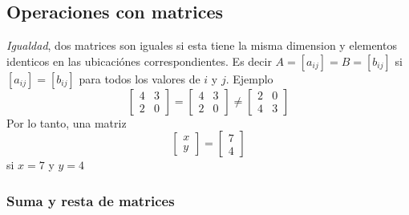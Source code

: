 \subsection{Operaciones con matrices}

\textit{Igualdad}, dos matrices son iguales si esta tiene la misma dimension y elementos identicos en las ubicaciónes correspondientes. Es decir  \(A = [a_{ij}] = B = [b_{ij}]\) si \([a_{ij}] = [b_{ij}]\) para todos los valores de \(i\) y \(j\). Ejemplo 
\[
\begin{bmatrix}
    4 & 3 \\
    2 & 0
\end{bmatrix}
= 
\begin{bmatrix}
    4 & 3 \\
    2 & 0
\end{bmatrix}
\neq
\begin{bmatrix}
    2 & 0 \\
    4 & 3 
\end{bmatrix}
\]
Por lo tanto, una matriz 
\[
\begin{bmatrix}
    x \\
    y
\end{bmatrix}
= \begin{bmatrix}
    7 \\
    4
\end{bmatrix}
\]
si \(x = 7\) y \(y = 4\)

\subsubsection{Suma y resta de matrices}

